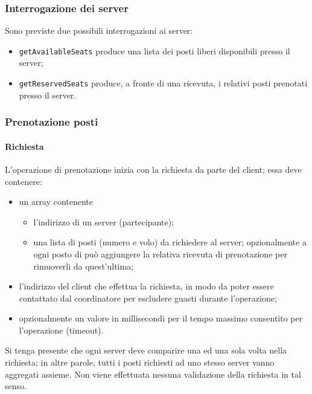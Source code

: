 \documentclass[a4paper]{article}
\begin{document}
\subsubsection{Interrogazione dei server}
Sono previste due possibili interrogazioni ai server:
\begin{itemize}
	\item \texttt{getAvailableSeats} produce una lista dei posti liberi disponibili presso il server;
	\item \texttt{getReservedSeats} produce, a fronte di una ricevuta, i relativi posti prenotati presso il server.
\end{itemize}


\subsubsection{Prenotazione posti}
\paragraph{Richiesta} L'operazione di prenotazione inizia con la richiesta da parte del client; essa deve contenere:
\begin{itemize}
	\item un array contenente
	\begin{itemize}
		\item l'indirizzo di un server (partecipante);
		\item una lista di posti (numero e volo) da richiedere al server; opzionalmente a ogni posto di può aggiungere la relativa ricevuta di prenotazione per rimuoverli da quest'ultima;
	\end{itemize}
	\item l'indirizzo del client che effettua la richiesta, in modo da poter essere contattato dal coordinatore per escludere guasti durante l'operazione;
	\item opzionalmente un valore in millisecondi per il tempo massimo consentito per l'operazione (timeout).
\end{itemize}
Si tenga presente che ogni server deve comparire una ed una sola volta nella richiesta; in altre parole, tutti i posti richiesti ad uno stesso server vanno aggregati assieme. Non viene effettuata nessuna validazione della richiesta in tal senso.
\end{document}

